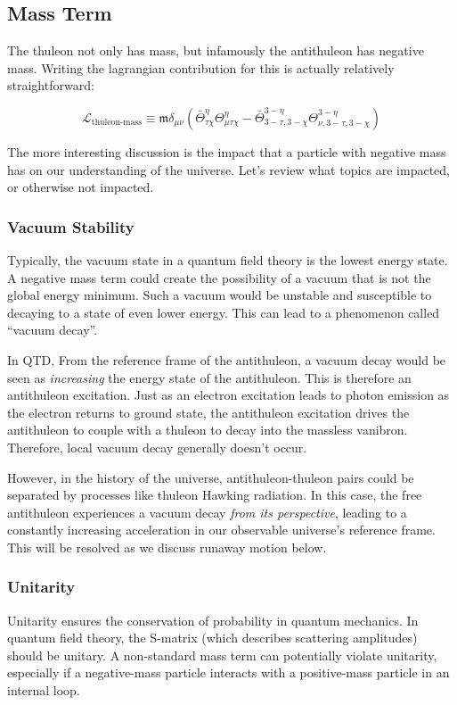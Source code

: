 \subsection{Mass Term}
The thuleon not only has mass, but infamously the antithuleon has negative mass. Writing the lagrangian contribution for this is actually relatively straightforward:
\begin{definition}
  \[
    \mathcal{L}_{\text{thuleon-mass}} \equiv \mathfrak{m} \delta_{\mu\nu} \left(
    \bar{\Theta}^{\eta}_{\tau \chi}\Theta^{\eta}_{\mu \tau \chi} - \bar{\Theta}^{3-\eta}_{3-\tau,3-\chi}\Theta^{3-\eta}_{\nu,3-\tau,3-\chi}
    \right)
  \]
\end{definition}

The more interesting discussion is the impact that a particle with negative mass has on our understanding of the universe. Let's review what topics are impacted, or otherwise not impacted.

\subsubsection{Vacuum Stability}
Typically, the vacuum state in a quantum field theory is the lowest energy state. A negative mass term could create the possibility of a vacuum that is not the global energy minimum. Such a vacuum would be unstable and susceptible to decaying to a state of even lower energy. This can lead to a phenomenon called ``vacuum decay''.

In QTD, From the reference frame of the antithuleon, a vacuum decay would be seen as \textit{increasing} the energy state of the antithuleon. This is therefore an antithuleon excitation. Just as an electron excitation leads to photon emission as the electron returns to ground state, the antithuleon excitation drives the antithuleon to couple with a thuleon to decay into the massless vanibron. Therefore, local vacuum decay generally doesn't occur.

However, in the history of the universe, antithuleon-thuleon pairs could be separated by processes like thuleon Hawking radiation. In this case, the free antithuleon experiences a vacuum decay \textit{from its perspective}, leading to a constantly increasing acceleration in our observable universe's reference frame. This will be resolved as we discuss runaway motion below.

\subsubsection{Unitarity}
Unitarity ensures the conservation of probability in quantum mechanics. In quantum field theory, the S-matrix (which describes scattering amplitudes) should be unitary. A non-standard mass term can potentially violate unitarity, especially if a negative-mass particle interacts with a positive-mass particle in an internal loop.

